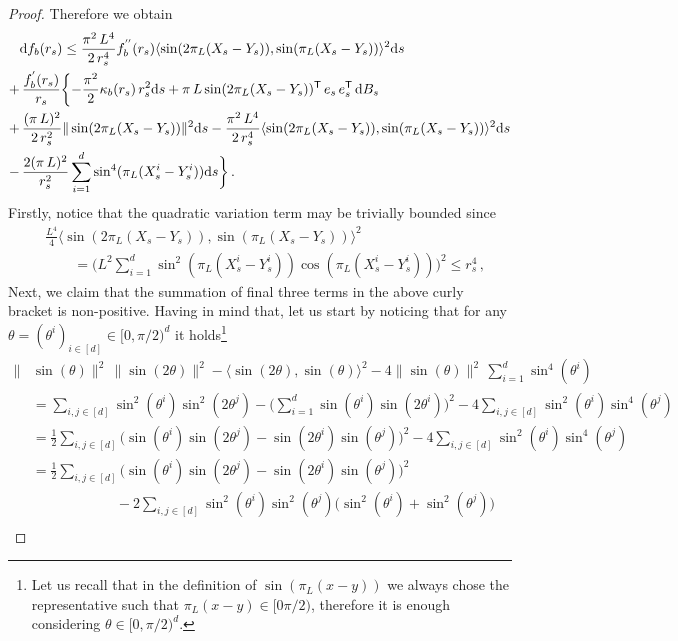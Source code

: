 \documentclass[final,12pt]{colt2023} %
\newcommand{\bes}{\begin{equation}}
\newcommand{\ees}{\end{equation}}
\newcommand{\De}{\mathrm{d}}
\begin{document}
\begin{proof}
Therefore we obtain
\bes
\begin{split}
    & \De f_b(r_s)\leq \frac{\pi^2 \, L^4}{2\,r_s^4}f_b^{''}(r_s)\langle \sin(2{\pi_L}(X_s-Y_s)),\sin({\pi_L}(X_s-Y_s))\rangle^2\De s \\ +&\,\frac{f_b^{'}(r_s)}{r_s}\biggl\{
    -\frac{{\pi}^2}{2}\kappa_b(r_s)\,r_s^2\De s+{\pi \, L}\sin(2{\pi_L}(X_s-Y_s))^{{\sf  T}}\,e_s\,e_s^{{\sf  T}}\,\De B_s\\
+&\,\frac{(\pi \, L)^2}{2\,r_s^2}\|\sin(2{\pi_L}(X_s-Y_s))\|^2\De s
-\frac{\pi^2 \, L^4 }{2\,r_s^{4}}\langle \sin(2{\pi_L}(X_s-Y_s)),\sin({\pi_L}(X_s-Y_s))\rangle^2\De s\\
- &\,\frac{2(\pi \, L)^2}{r_s^2}\sum_{i=1}^d\sin^4({\pi_L}(X_s^i-Y_s^i))\De s
\biggr\}   \,.
\end{split}
\ees
Firstly, notice that the quadratic variation term may be trivially bounded since
\bes
\begin{split}
& \frac{L^4}{4}\langle \sin(2{\pi_L}(X_s-Y_s)),\sin({\pi_L}(X_s-Y_s))\rangle^2\\
&\qquad =\biggl(L^2\sum_{i=1}^d\sin^2({\pi_L}(X_s^i-Y_s^i))\cos({\pi_L}(X_s^i-Y_s^i))\biggr)^2\leq r^4_s\,,
\end{split}
\ees
Next, we claim that the summation of  final three terms in the above curly bracket is non-positive. Having in mind that, let us start by noticing that for any $\theta=(\theta^i)_{i\in[d]}\in [0,\pi/2)^d$ it holds\footnote{Let us recall that in the definition of $\sin(\pi_L(x-y))$ we always chose the representative such that $\pi_L(x-y)\in[0\pi/2)$, therefore it is enough considering $\theta\in[0,\pi/2)^d$.} 
\begin{align}
\|&\sin(\theta)\|^2\,\|\sin(2\theta)\|^2
-\langle \sin(2\theta),\sin(\theta)\rangle^2
- 4 \|\sin(\theta)\|^2\, \sum_{i=1}^d\sin^4(\theta^i)\\
&  = \sum_{i,j\in[d]} \sin^2(\theta^i) \sin^2( 2 \theta^j) - \biggl(\sum_{i=1}^d \sin(\theta^i) \sin( 2 \theta^i)\biggr)^2 -4 \sum_{i,j\in[d]} \sin^2(\theta^i) \sin^4( \theta^j)\\
&  = \frac{1}{2}\sum_{i,j\in[d]}\biggl(\sin(\theta^i) \sin( 2 \theta^j) - \sin(2 \theta^i) \sin(\theta^j)\biggr)^2 -4 \sum_{i,j\in[d]} \sin^2(\theta^i) \sin^4( \theta^j)\\
& = \frac{1}{2}\sum_{i,j\in[d]}\biggl(\sin(\theta^i) \sin( 2 \theta^j) - \sin(2 \theta^i) \sin(\theta^j)\biggr)^2 \\
 &\qquad\qquad\qquad-2 \sum_{i,j\in[d]} \sin^2(\theta^i) \sin^2( \theta^j) \biggl(\sin^2(\theta^i) + \sin^2( \theta^j)\biggr)\\

\end{align}
\end{proof}
\end{document}
